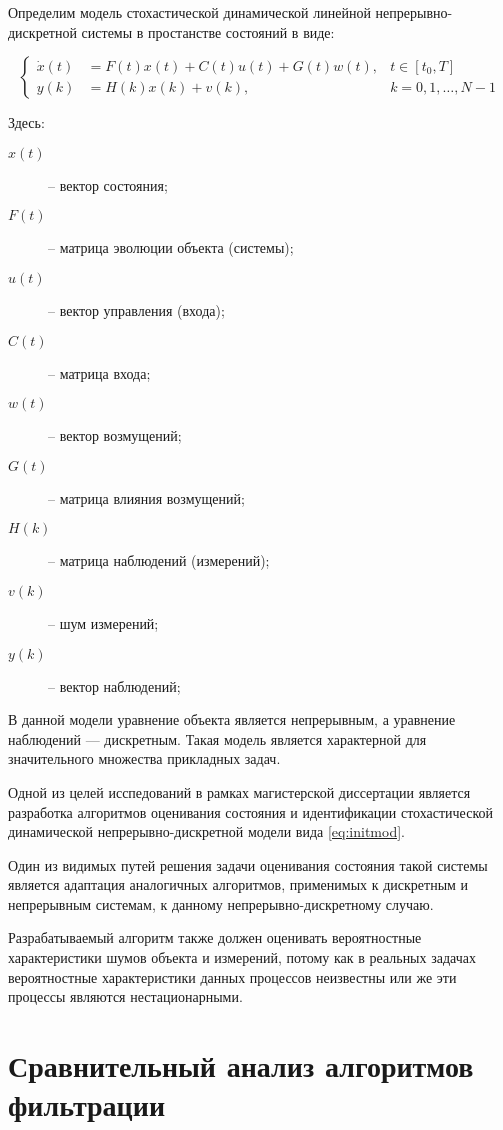 \documentclass[a4paper,12pt]{article}
\begin{document}
Определим модель стохастической динамической линейной непрерывно-дискретной
системы в простанстве состояний в виде:

\begin{equation}
	\label{eq:initmod}
	\left\{ 
		\begin{array}{lll}
			\dot{x}(t) &= F(t) x(t) + C(t) u(t) + G(t) w(t), & t \in [t_0,T] \\ 
			y(k)       &= H(k) x(k) + v(k),                  & k = 0,1,\ldots, N-1
		\end{array} 
	\right. 
\end{equation}

Здесь:
\begin{description}
	\item [$x(t)$] -- вектор состояния;
	\item [$F(t)$] -- матрица эволюции объекта (системы);
	\item [$u(t)$] -- вектор управления (входа);
	\item [$C(t)$] -- матрица входа;
	\item [$w(t)$] -- вектор возмущений;
	\item [$G(t)$] -- матрица влияния возмущений;
	\item [$H(k)$] -- матрица наблюдений (измерений);
	\item [$v(k)$] -- шум измерений;
	\item [$y(k)$] -- вектор наблюдений;
\end{description}

В данной модели уравнение объекта является непрерывным, а уравнение наблюдений
--- дискретным. Такая модель является характерной для значительного множества
прикладных задач.

Одной из целей исспедований в рамках магистерской диссертации является
разработка алгоритмов оценивания состояния и идентификации стохастической 
динамической непрерывно-дискретной модели вида \ref{eq:initmod}. 

Один из видимых путей решения задачи оценивания состояния такой системы
является адаптация аналогичных алгоритмов, применимых к дискретным и
непрерывным системам, к данному непрерывно-дискретному случаю.

Разрабатываемый алгоритм также должен оценивать вероятностные характеристики
шумов объекта и измерений, потому как в реальных задачах вероятностные
характеристики данных процессов неизвестны или же эти процессы являются
нестационарными.

\section{Сравнительный анализ алгоритмов фильтрации}
\end{document}
